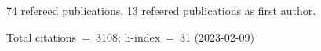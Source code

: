 74 refereed publications. 13 refeered publications as first author.

Total citations~=~3108; h-index~=~31 (2023-02-09)